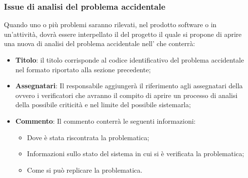         \subsubsection{Issue di analisi del problema accidentale}
            Quando uno o più problemi saranno rilevati, nel prodotto software o in un'attività, dovrà essere interpellato il  del progetto il quale si propone di aprire una nuova  di analisi del problema accidentale nell' che conterrà:
            \begin{itemize}
                \item\textbf{Titolo}: il titolo corrisponde al codice identificativo del problema accidentale nel formato riportato alla sezione precedente;
                \item\textbf{Assegnatari}: Il responsabile aggiungerà il riferimento agli assegnatari della  ovvero i verificatori che avranno il compito di aprire un processo di analisi della possibile criticità e nel limite del possibile sistemarla;
                \item\textbf{Commento}: Il commento conterrà le seguenti informazioni:
                    \begin{itemize}
                        \item Dove è stata riscontrata la problematica;
                        \item Informazioni sullo stato del sistema in cui si è verificata la problematica;
                        \item Come si può replicare la problematica.
                    \end{itemize}                
            \end{itemize}    
